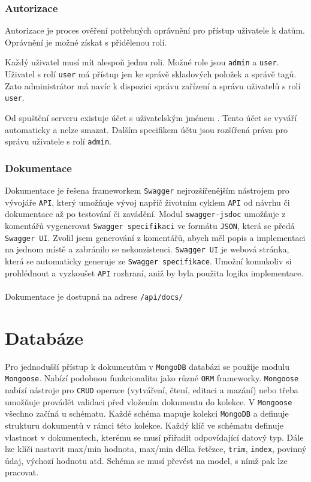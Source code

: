 \documentclass[czech,BP]{thesiskiv}
\begin{document}
	\subsubsection{Autorizace}
	Autorizace je proces ověření potřebných oprávnění pro přístup uživatele k datům. Oprávnění je možné získat s přidělenou rolí.
	
	Každý uživatel musí mít alespoň jednu roli. Možné role jsou \texttt{admin} a \texttt{user}. 
	Uživatel s rolí \texttt{user} má přístup jen ke správě skladových položek a správě tagů. 
	Zato administrátor má navíc k dispozici správu zařízení a správu uživatelů s rolí \texttt{user}.
	
	Od spuštění serveru existuje účet s uživatelským jménem .
	Tento účet se vyváří automaticky a nelze smazat. Dalším specifikem účtu jsou rozšířená práva pro správu uživatele s rolí \texttt{admin}.
	
	
	\subsubsection{Dokumentace}
	Dokumentace je řešena frameworkem \texttt{Swagger} nejrozšířenějším nástrojem pro vývojáře \texttt{API}, který umožňuje vývoj napříč životním cyklem \texttt{API} od návrhu či dokumentace až po testování či zavádění.	
	Modul \texttt{swagger-jsdoc} umožňuje z komentářů vygenerovat \texttt{Swagger specifikaci} ve formátu \texttt{JSON}, která se předá  \texttt{Swagger UI}. 
	Zvolil jsem generování z komentářů, abych měl popis a implementaci na jednom místě a zabránilo se nekonzistenci.
	\texttt{Swagger UI} je webová stránka, která se automaticky generuje ze \texttt{Swagger specifikace}. Umožní komukoliv si prohlédnout a vyzkoušet \texttt{API} rozhraní, aniž by byla použita logika implementace.
	\\\\
	Dokumentace je dostupná na adrese \texttt{/api/docs/}



	\section{Databáze}
	Pro jednodušší přístup k dokumentům v \texttt{MongoDB} databázi se použije modulu \texttt{Mongoose}. Nabízí podobnou funkcionalitu jako různé \texttt{ORM} frameworky.
	\texttt{Mongoose} nabízí nástroje pro \texttt{CRUD} operace (vytváření, čtení, editaci a mazání) nebo třeba umožňuje provádět validaci před vložením dokumentu do kolekce. V \texttt{Mongoose} všechno začíná u schématu. Každé schéma mapuje kolekci \texttt{MongoDB} a definuje strukturu dokumentů v rámci této kolekce. Každý klíč ve schématu definuje vlastnost v dokumentech, kterému se musí přiřadit odpovídající datový typ. Dále lze klíči nastavit max/min hodnota, max/min délka řetězce, \texttt{trim}, \texttt{index}, povinný údaj, výchozí hodnotu atd. Schéma se musí převést na model, s nímž pak lze pracovat.
	
\end{document}
